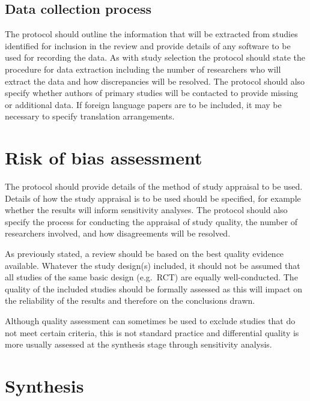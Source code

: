 \documentclass[
  11pt,
  a4paper,
  DIV=11,
  numbers=noendperiod]{scrreprt}
\begin{document}
\subsection{Data collection process}\label{data-collection-process}

The protocol should outline the information that will be extracted from
studies identified for inclusion in the review and provide details of
any software to be used for recording the data. As with study selection
the protocol should state the procedure for data extraction including
the number of researchers who will extract the data and how
discrepancies will be resolved. The protocol should also specify whether
authors of primary studies will be contacted to provide missing or
additional data. If foreign language papers are to be included, it may
be necessary to specify translation arrangements.

\section{Risk of bias assessment}\label{risk-of-bias-assessment}

The protocol should provide details of the method of study appraisal to
be used. Details of how the study appraisal is to be used should be
specified, for example whether the results will inform sensitivity
analyses. The protocol should also specify the process for conducting
the appraisal of study quality, the number of researchers involved, and
how disagreements will be resolved.

As previously stated, a review should be based on the best quality
evidence available. Whatever the study design(s) included, it should not
be assumed that all studies of the same basic design (e.g.~RCT) are
equally well-conducted. The quality of the included studies should be
formally assessed as this will impact on the reliability of the results
and therefore on the conclusions drawn.

Although quality assessment can sometimes be used to exclude studies
that do not meet certain criteria, this is not standard practice and
differential quality is more usually assessed at the synthesis stage
through sensitivity analysis.

\section{Synthesis}\label{synthesis}
\end{document}
